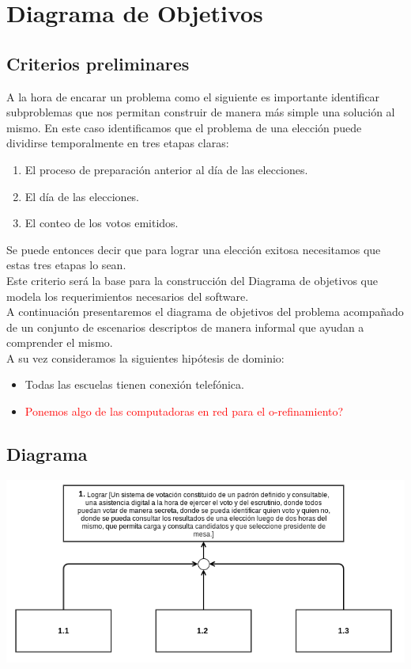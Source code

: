 \section{Diagrama de Objetivos}

\subsection{Criterios preliminares}

A la hora de encarar un problema como el siguiente es importante identificar subproblemas que 
nos permitan construir de manera más simple una solución al mismo. En este caso identificamos que 
el problema de una elección puede dividirse temporalmente en tres etapas claras:

\begin{enumerate}
\item El proceso de preparación anterior al día de las elecciones.
\item El día de las elecciones.
\item El conteo de los votos emitidos.
\end{enumerate}

Se puede entonces decir que para lograr una elección exitosa necesitamos que estas tres etapas lo sean.\\

Este criterio será la base para la construcción del Diagrama de objetivos que modela los requerimientos necesarios del software.	\\

A continuación presentaremos el diagrama de objetivos del problema acompañado de un conjunto de escenarios descriptos de manera informal que ayudan a comprender el mismo.\\

A su vez consideramos la siguientes hipótesis de dominio:

\begin{itemize}
\item Todas las escuelas tienen conexión telefónica.
\item \textcolor{red}{Ponemos algo de las computadoras en red para el o-refinamiento?}
\end{itemize}

\newpage
\subsection{Diagrama}

\includegraphics[scale=0.55]{imagenes/Diagramas/1.png}